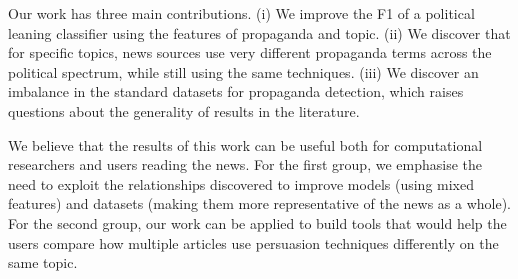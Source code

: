 Our work has three main contributions.
(i) We improve the F1 of a political leaning classifier using the features of propaganda and topic.
(ii)
We discover that for specific topics, news sources use very different propaganda terms across the political spectrum, while still using the same techniques.
(iii) We discover an imbalance in the standard datasets for propaganda detection, which raises questions about the generality of results in the literature.


We believe that the results of this work can be useful both for computational researchers and users reading the news.
For the first group, we emphasise the need to exploit the relationships discovered to improve models (using mixed features) and datasets (making them more representative of the news as a whole).
For the second group, our work can be applied to build tools that would help the users compare how multiple articles use persuasion techniques differently on the same topic.
